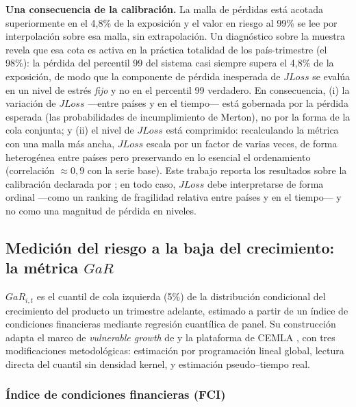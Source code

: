 \noindent\textbf{Una consecuencia de la calibración.} La malla de pérdidas está acotada
superiormente en el 4,8\% de la exposición y el valor en riesgo al 99\% se lee por
interpolación sobre esa malla, sin extrapolación. Un diagnóstico sobre la muestra revela que
esa cota es activa en la práctica totalidad de los país-trimestre (el 98\%): la
pérdida del percentil 99 del sistema casi siempre supera el 4,8\% de la exposición, de modo
que la componente de pérdida inesperada de $JLoss$ se evalúa en un nivel de estrés
\emph{fijo} y no en el percentil 99 verdadero. En consecuencia, (i) la variación de $JLoss$
—entre países y en el tiempo— está gobernada por la pérdida esperada (las
probabilidades de incumplimiento de Merton), no por la forma de la cola conjunta; y (ii) el
nivel de $JLoss$ está comprimido: recalculando la métrica con una malla más ancha, $JLoss$
escala por un factor de varias veces, de forma heterogénea entre países pero preservando en lo
esencial el ordenamiento (correlación $\approx0{,}9$ con la serie base). Este trabajo reporta
los resultados sobre la calibración declarada por \citet{Chari2024b}; en todo caso, $JLoss$
debe interpretarse de forma ordinal —como un ranking de fragilidad relativa entre
países y en el tiempo— y no como una magnitud de pérdida en niveles.

\subsection{Medición del riesgo a la baja del crecimiento: la métrica \texorpdfstring{$GaR$}{GaR}}

$GaR_{i,t}$ es el cuantil de cola izquierda (5\%) de la distribución condicional del crecimiento del producto un trimestre adelante, estimado a partir de un índice de condiciones financieras mediante regresión cuantílica de panel. Su construcción adapta el marco de \textit{vulnerable growth} de \citet{ABG2019b} y la plataforma de CEMLA \citep{OssandonBusch2022}, con tres modificaciones metodológicas: estimación por programación lineal global, lectura directa del cuantil sin densidad kernel, y estimación pseudo–tiempo real.

\subsubsection{Índice de condiciones financieras (FCI)}

